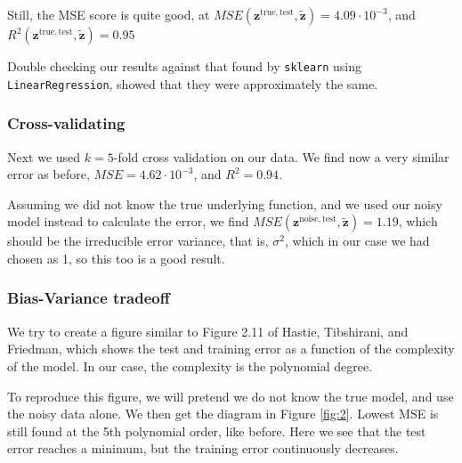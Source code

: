\documentclass[a4paper,10pt,english]{article}
\def\code#1{\texttt{#1}} %
\begin{document}
Still, the MSE score is quite good, at $MSE(\bm{z}^\mathrm{true,test}, \bm{\tilde z})=4.09\cdot 10 ^{-3}$, and $R^2(\bm{z}^\mathrm{true,test}, \bm{\tilde z})=0.95$

Double checking our results against that found by \code{sklearn} using \code{LinearRegression}, showed that they were approximately the same.

\subsubsection{Cross-validating}
Next we used $k=5$-fold cross validation on our data.
We find now a very similar error as before, $MSE = 4.62\cdot 10^{-3}$, and $R^2= 0.94$.

Assuming we did not know the true underlying function, and we used our noisy model instead to calculate the error, we find
$MSE(\bm{z}^\mathrm{noise,test}, \bm{\tilde z}) = 1.19$,
which should be the irreducible error variance, that is, $\sigma^2$, which in our case we had chosen as 1, so this too is a good result.


\subsubsection{ Bias-Variance tradeoff}
We try to create a figure similar to Figure 2.11 of Hastie, Tibshirani, and Friedman, which shows the test and training error as a function of the complexity of the model. In our case, the complexity is the polynomial degree.

To reproduce this figure, we will pretend we do not know the true model, and use the noisy data alone. We then get the diagram in Figure \ref{fig:2}. Lowest MSE is still found at the 5th polynomial order, like before. Here we see that the test error reaches a minimum, but the training error continuously decreases.
 
\end{document}
